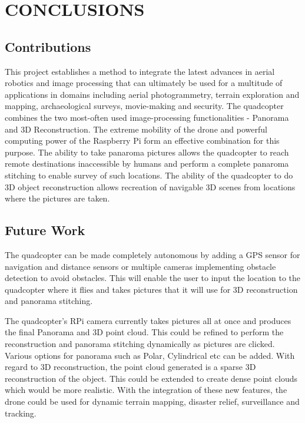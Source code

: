 
\chapter{CONCLUSIONS} %
\section{Contributions}
This project establishes a method to integrate the latest advances in aerial robotics and image processing that can ultimately be used for a multitude of applications in domains including aerial photogrammetry, terrain exploration and mapping, archaeological surveys, movie-making and security. The quadcopter combines the two most-often used image-processing functionalities - Panorama and 3D Reconstruction. The extreme mobility of the drone and powerful computing power of the Raspberry Pi form an effective combination for this purpose.
The ability to take panaroma pictures allows the quadcopter to reach remote destinations inaccessible by humans and perform a complete panaroma stitching to enable survey of such locations.
The ability of the quadcopter to do 3D object reconstruction allows recreation of navigable 3D scenes from locations where the pictures are taken.
\section{Future Work}
The quadcopter can be made completely autonomous by adding a GPS sensor for navigation and distance sensors or multiple cameras implementing obstacle detection to avoid obstacles. This will enable the user to input the location to the quadcopter where it flies and takes pictures that it will use for 3D reconstruction and panorama stitching.

The quadcopter's RPi camera currently takes pictures all at once and produces the final Panorama and 3D point cloud. This could be refined to perform the reconstruction and panorama stitching dynamically as pictures are clicked. Various options for panorama such as Polar, Cylindrical etc can be added. With regard to 3D reconstruction, the point cloud generated is a sparse 3D reconstruction of the object. This could be extended to create dense point clouds which would be more realistic.
With the integration of these new features, the drone could be used for dynamic terrain mapping, disaster relief, surveillance and tracking.